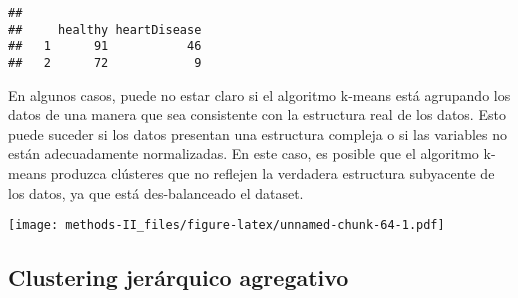 \documentclass[
]{article}
\newenvironment{Shaded}{\begin{snugshade}}{\end{snugshade}}
\newcommand{\AttributeTok}[1]{\textcolor[rgb]{0.77,0.63,0.00}{#1}}
\newcommand{\ControlFlowTok}[1]{\textcolor[rgb]{0.13,0.29,0.53}{\textbf{#1}}}
\newcommand{\DecValTok}[1]{\textcolor[rgb]{0.00,0.00,0.81}{#1}}
\newcommand{\FunctionTok}[1]{\textcolor[rgb]{0.00,0.00,0.00}{#1}}
\newcommand{\NormalTok}[1]{#1}
\newcommand{\OtherTok}[1]{\textcolor[rgb]{0.56,0.35,0.01}{#1}}
\newcommand{\SpecialCharTok}[1]{\textcolor[rgb]{0.00,0.00,0.00}{#1}}
\newcommand{\StringTok}[1]{\textcolor[rgb]{0.31,0.60,0.02}{#1}}
\begin{document}
\begin{Shaded}
\end{Shaded}

\begin{verbatim}
##    
##     healthy heartDisease
##   1      91           46
##   2      72            9
\end{verbatim}

En algunos casos, puede no estar claro si el algoritmo k-means está
agrupando los datos de una manera que sea consistente con la estructura
real de los datos. Esto puede suceder si los datos presentan una
estructura compleja o si las variables no están adecuadamente
normalizadas. En este caso, es posible que el algoritmo k-means produzca
clústeres que no reflejen la verdadera estructura subyacente de los
datos, ya que está des-balanceado el dataset.

\begin{Shaded}
\end{Shaded}

\texttt{[image: methods-II\_files/figure-latex/unnamed-chunk-64-1.pdf]}

\hypertarget{clustering-jeruxe1rquico-agregativo}{%
\subsection{Clustering jerárquico
agregativo}\label{clustering-jeruxe1rquico-agregativo}}
\end{document}
